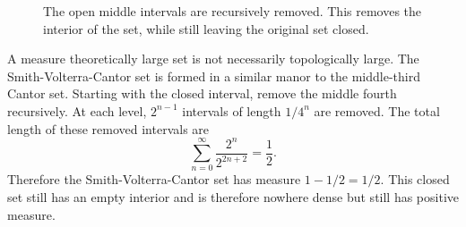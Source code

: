 \begin{figure}
    \begin{center}
    
\end{center}
\caption{The open middle intervals are recursively removed.  This removes the interior of the set, while still leaving the original set closed.  }
    \label{fig:my_label}
\end{figure}


\begin{example}A measure theoretically large set is not necessarily topologically large.
    The Smith-Volterra-Cantor set is formed in a similar manor to the middle-third Cantor set.  Starting with the closed interval, remove the middle fourth recursively.  At each level, $2^{n-1}$ intervals of length $1/4^n$ are removed.  The total length of these removed intervals are $$\sum_{n=0}^\infty \frac{2^n}{2^{2n+2}} = \frac{1}{2}.$$
    Therefore the Smith-Volterra-Cantor set has measure $1 - 1/2 = 1/2.$
    This closed set still has an empty interior and is therefore nowhere dense but still has positive measure. 
\end{example}

